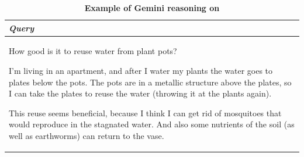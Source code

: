 \begin{table}[ht]
\caption{\textbf{Example of Gemini reasoning on \sustainable}}
\centering
\begin{tabular}{p{13cm}}
\toprule
\textit{\textbf{Query}} \\
\midrule
How good is it to reuse water from plant pots?

I'm living in an apartment, and after I water my plants the water goes to plates below the pots. The pots are in a metallic structure above the plates, so I can take the plates to reuse the water (throwing it at the plants again).

This reuse seems beneficial, because I think I can get rid of mosquitoes that would reproduce in the stagnated water. And also some nutrients of the soil (as well as earthworms) can return to the vase.


\end{tabular}
\end{table}
